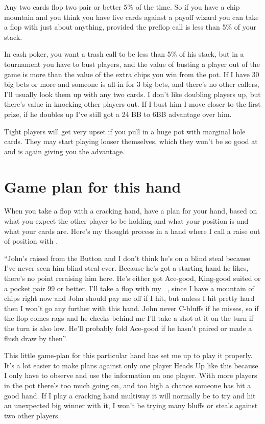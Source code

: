 Any two cards flop two pair or better 5\% of the time. So if you have
a chip mountain and you think you have live cards against a payoff
wizard you can take a flop with just about anything, provided the
preflop call is less than 5\% of your stack.

In cash poker, you want a trash call to be less than 5\% of his stack,
but in a tournament you have to bust players, and the value of
busting a player out of the game is more than the value of the
extra chips you win from the pot. If I have 30 big bets or more and
someone is all-in for 3 big bets, and there's no other callers, I'll
usually look them up with any two cards. I don't like doubling players
up, but there's value in knocking other players out. If I bust him
I move closer to the first prize, if he doubles up I've still got
a 24 BB to 6BB advantage over him.

Tight players will get very upset if you pull in a huge pot
with marginal hole cards. They may start playing looser themselves,
which they won't be so good at and is again giving you the advantage.

\section{Game plan for this hand}

When you take a flop with a cracking hand, have a plan for your hand,
based on what you expect the other player to be holding and what your
position is and what your cards are. Here's my thought process
in a hand where I call a raise out of position with \eigc\sixc.

``John's raised from the Button and I don't think he's on a blind
steal because I've never seen him blind steal ever. Because he's
got a starting hand he likes, there's no point reraising him here. He's
either got Ace-good, King-good suited or a pocket pair 99 or better.
I'll take a flop with my \eigc\sixc\ , since I have a mountain of
chips right now and John should pay me off if I hit, but unless I
hit pretty hard then I won't go any further with this hand. John
never C-bluffs if he misses, so if the flop comes rags and he checks
behind me I'll take a shot at it on the turn if the turn is also low.
He'll probably fold Ace-good if he hasn't paired or made a flush
draw by then''.

This little game-plan for this particular hand has set me
up to play it properly. It's a lot easier to make plans
against only one player Heads Up like this because I only have
to observe and use the information on one player. With more players
in the pot there's too much going on, and too high a chance someone
has hit a good hand. If I play a cracking hand multiway it will
normally be to try and hit an unexpected big winner with it, I won't
be trying many bluffs or steals against two other players.

